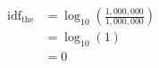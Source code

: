\documentclass[preview]{standalone}
\begin{document}
\begin{align*}
\text{idf}_{\text{the}} &= \log_{10} \left( \frac{1,000,000}{1,000,000} \right)\\ &= \log_{10}(1)\\ &= 0
\end{align*}
\end{document}
